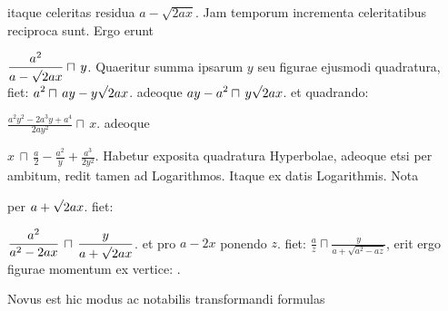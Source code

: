 itaque celeritas residua
$\displaystyle a - \sqrt{2ax}$.
Jam temporum incrementa celeritatibus reciproca sunt. 
Ergo erunt
\rule[-4mm]{0mm}{10mm}$\displaystyle \frac{a^2}{a - \sqrt{\protect\vphantom{2ax}} 2ax} \sqcap \, y$.
Quaeritur summa ipsarum $\displaystyle y$ seu figurae ejusmodi quadratura, fiet:
$\displaystyle a^2 \sqcap \, ay - y \sqrt{\protect\vphantom{2ax}} 2ax$.
adeoque
$\displaystyle ay - a^2 \sqcap \, y \sqrt{\protect\vphantom{2ax}} 2ax$.
et quadrando:
\rule[-4mm]{0mm}{10mm}$\displaystyle \frac{a^2y^2 - 2a^3y + a^4}{2ay^2} \sqcap \, x$. adeoque
\rule[-4mm]{0mm}{10mm}$\displaystyle x \, \sqcap \, \frac{a}{2} - \frac{a^2}{y} + \frac{a^3}{2y^2}$.
Habetur  exposita quadratura Hyperbolae, adeoque etsi per ambitum, redit tamen ad
\pend
\count{}
\pstart
\noindent Logarithmos. Itaque ex datis
Logarithmis.
Nota \rule[-4mm]{0mm}{10mm} per 
$\displaystyle a + \sqrt{\protect\vphantom{2ax}}2ax$.
fiet:
\rule[-4mm]{0mm}{10mm}$\displaystyle \frac{a^2}{a^2 - 2ax} \, \sqcap \, \frac{y}{a + \sqrt{\protect\vphantom{2ax}}2ax}$.
et pro 
$\displaystyle a - 2x$ ponendo $\displaystyle z$.
fiet:
$\displaystyle \frac{a}{z} \sqcap \frac{y}{a + \sqrt{a^2 - az}}$,
erit ergo figurae momentum ex vertice:
{
}. 
\rule[-4mm]{0mm}{10mm}Novus est hic modus ac notabilis transformandi formulas 
